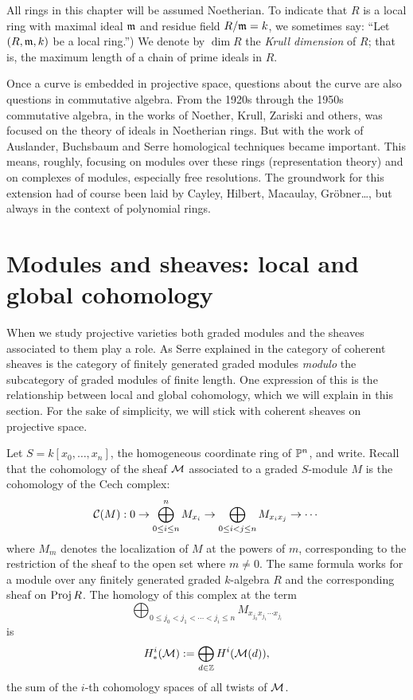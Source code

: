 All rings in this chapter will be assumed Noetherian. To indicate that $R$ is a local ring with maximal ideal $\gm$ and residue field $R/\gm = k$, we sometimes  say: ``Let $(R,\gm,k)$ be a local ring.'') We denote by $\dim R$ the \emph{Krull dimension} of $R$; that is, the maximum length of a chain of prime ideals in $R$.

Once a curve is embedded in projective space, questions about the curve are also questions in commutative algebra. From the 1920s through the 1950s commutative algebra, in the works of Noether,  Krull,  Zariski and others, was focused on the theory of ideals in Noetherian rings. But with the work of Auslander, Buchsbaum and Serre homological techniques became important. This means, roughly, focusing on modules over these rings (representation theory) and on complexes of modules, especially free resolutions. The groundwork for this extension had of course been laid by Cayley, Hilbert, Macaulay, Gr\"obner\dots, but always in the context of polynomial rings. 

\section{Modules and sheaves: local and global cohomology}\label{local coho section}

When we study projective varieties both graded modules and the sheaves associated to them play a role. As Serre explained in %
the category of coherent sheaves is the category of finitely generated graded modules \emph{modulo} the subcategory of graded modules of finite length. One expression of this is the relationship between local and global cohomology, which we will explain in this section. For the sake of simplicity, we will stick with coherent sheaves on projective space.

Let $S= k[x_{0}, \dots, x_{n}]$, the homogeneous coordinate ring of $\PP^{n}$, and write. Recall that the cohomology of the sheaf $\cM$ associated to a graded $S$-module $M$ is the cohomology of the Cech complex:
$$
\cC(M): 0\to \bigoplus_{0\leq i \leq n}^{n} M_{x_{i}} \to \bigoplus_{0\leq i<j\leq n} M_{x_{i}x_{j}} \to \cdots
$$
where $M_{m}$ denotes the localization of $M$ at the powers of $m$, corresponding to the restriction of the sheaf to the open set where $m \neq 0$. The same formula works for a module 
over any finitely generated graded $k$-algebra $R$ and the corresponding sheaf on $\Proj R$.
The homology of this complex at the term
$$
\bigoplus_{0\leq j_{0}<j_{1}<\cdots<j_{i}\leq n} M_{x_{j_{0}}x_{j_{1}}\cdots x_{j_{i}}}
$$
is 
$$
H^{i}_{*}(\cM):= \bigoplus_{d\in \ZZ} H^{i}(\cM(d)),
$$
the sum of the $i$-th cohomology spaces of all twists of $\cM$.

